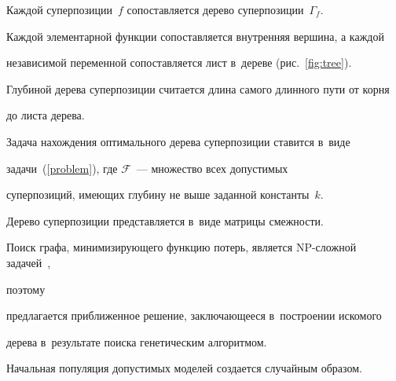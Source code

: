 


Каждой суперпозиции~$f$ сопоставляется дерево суперпозиции~$\Gamma_f$. 

Каждой элементарной функции сопоставляется внутренняя вершина, а каждой 

независимой переменной сопоставляется лист в~дереве (рис.~\ref{fig:tree}). 

Глубиной дерева суперпозиции считается длина самого длинного пути от корня 

до листа дерева.

Задача на\-хож\-де\-ния оптимального дерева суперпозиции ставится в~виде 

задачи~(\ref{problem}), где $\mathcal{F}$~--- множество всех допустимых 

суперпозиций, имеющих глубину не выше заданной константы~$k$.







Дерево суперпозиции представляется в~виде матрицы смежности. 

Поиск графа, минимизирующего функцию потерь, является NP-слож\-ной задачей~\cite{np}, 

поэтому

предлагается приближенное решение, заключающееся в~построении искомого 

дерева в~результате поиска генетическим алгоритмом.

Начальная популяция допустимых моделей создается случайным образом.



